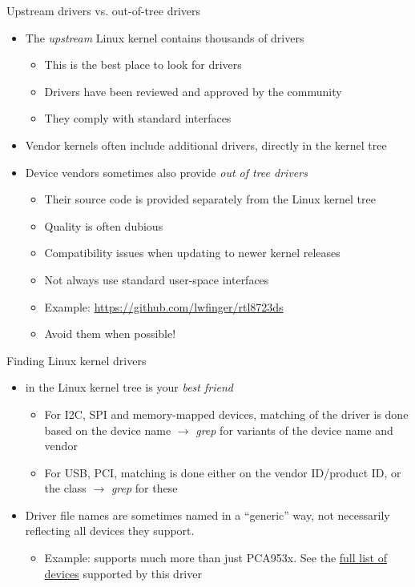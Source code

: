 \begin{frame}{Upstream drivers vs. out-of-tree drivers}
  \begin{itemize}
  \item The {\em upstream} Linux kernel contains thousands of drivers
    \begin{itemize}
    \item This is the best place to look for drivers
    \item Drivers have been reviewed and approved by the community
    \item They comply with standard interfaces
    \end{itemize}
  \item Vendor kernels often include additional drivers, directly in
    the kernel tree
  \item Device vendors sometimes also provide {\em out of tree
      drivers}
    \begin{itemize}
    \item Their source code is provided separately from the Linux
      kernel tree
    \item Quality is often dubious
    \item Compatibility issues when updating to newer kernel releases
    \item Not always use standard user-space interfaces
    \item Example: \url{https://github.com/lwfinger/rtl8723ds}
    \item Avoid them when possible!
    \end{itemize}
  \end{itemize}
\end{frame}

\begin{frame}{Finding Linux kernel drivers}
  \begin{itemize}
  \item {} in the Linux kernel tree is your {\em best friend}
    \begin{itemize}
    \item For I2C, SPI and memory-mapped devices, matching of the
      driver is done based on the device name $\rightarrow$ {\em grep}
      for variants of the device name and vendor
    \item For USB, PCI, matching is done either on the vendor
      ID/product ID, or the class $\rightarrow$ {\em grep} for these
    \end{itemize}
  \item Driver file names are sometimes named in a ``generic'' way,
    not necessarily reflecting all devices they support.
    \begin{itemize}
    \item Example:  supports much
      more than just PCA953x. See the
      \href{https://elixir.bootlin.com/linux/v5.19/source/drivers/gpio/gpio-pca953x.c\#L1221}{full
        list of devices} supported by this driver
    \end{itemize}
  \end{itemize}
\end{frame}

